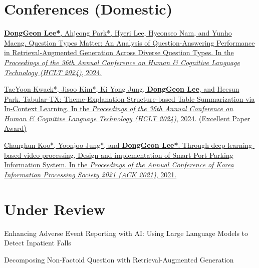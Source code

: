 \documentclass[letterpaper,11pt]{article}
\begin{document}
    \section{Conferences (Domestic)}
    \begin{enumerate}[noitemsep, leftmargin=*,label={[\arabic*]}]
        \item \href{https://donggeon.github.io/assets/publications/2024_question_types_matter/paper.pdf}{\textbf{DongGeon Lee*}, Ahjeong Park*, Hyeri Lee, Hyeonseo Nam, and Yunho Maeng. Question Types Matter: An Analysis of Question-Answering Performance in Retrieval-Augmented Generation Across Diverse Question Types. In the \textit{Proceedings of the 36th Annual Conference on Human \& Cognitive Language Technology (HCLT 2024)}, 2024.}
        \item \href{https://donggeon.github.io/assets/publications/2024_Tabular-TX/paper.pdf}{TaeYoon Kwack*, Jisoo Kim*, Ki Yong Jung, \textbf{DongGeon Lee}, and Heesun Park. Tabular-TX: Theme-Explanation Structure-based Table Summarization via In-Context Learning. In the \textit{Proceedings of the 36th Annual Conference on Human \& Cognitive Language Technology (HCLT 2024)}, 2024.} \href{https://kli.korean.go.kr/benchmark/taskBoardsOrdtm/boardsOrdtm/noticeView.do?page=0&recordId=269&boardOrdtmId=&base.condition=boardOrdtm.title&base.keyword=&size=10}{(Excellent Paper Award)}
        \item \href{https://doi.org/10.3745/PKIPS.y2021m11a.1342}{Changhun Koo*, Yoonjoo Jung*, and \textbf{DongGeon Lee*}. Through deep learning-based video processing, Design and implementation of Smart Port Parking Information System. In the \textit{Proceedings of the Annual Conference of Korea Information Processing Society 2021 (ACK 2021)}, 2021.}
        
    \end{enumerate}

    
    \section{Under Review}
    \begin{enumerate}[noitemsep, leftmargin=*,label={[\arabic*]}]
        \item Enhancing Adverse Event Reporting with AI: Using Large Language Models to Detect Inpatient Falls
        \item Decomposing Non-Factoid Question with Retrieval-Augmented Generation
    \end{enumerate}
    
\end{document}
